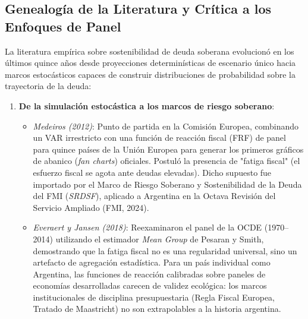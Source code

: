 \documentclass[11pt,a4paper]{article}
\begin{document}
\subsection{Genealogía de la Literatura y Crítica a los Enfoques de Panel}
La literatura empírica sobre sostenibilidad de deuda soberana evolucionó en los últimos quince años desde proyecciones determinísticas de escenario único hacia marcos estocásticos capaces de construir distribuciones de probabilidad sobre la trayectoria de la deuda:
\begin{enumerate}[leftmargin=1.5em]
    \item \textbf{De la simulación estocástica a los marcos de riesgo soberano}:
    \begin{itemize}
        \item \textit{Medeiros (2012)}: Punto de partida en la Comisión Europea, combinando un VAR irrestricto con una función de reacción fiscal (FRF) de panel para quince países de la Unión Europea para generar los primeros gráficos de abanico (\textit{fan charts}) oficiales. Postuló la presencia de "fatiga fiscal" (el esfuerzo fiscal se agota ante deudas elevadas). Dicho supuesto fue importado por el Marco de Riesgo Soberano y Sostenibilidad de la Deuda del FMI (\textit{SRDSF}), aplicado a Argentina en la Octava Revisión del Servicio Ampliado (FMI, 2024).
        \item \textit{Everaert y Jansen (2018)}: Reexaminaron el panel de la OCDE (1970--2014) utilizando el estimador \textit{Mean Group} de Pesaran y Smith, demostrando que la fatiga fiscal no es una regularidad universal, sino un artefacto de agregación estadística. Para un país individual como Argentina, las funciones de reacción calibradas sobre paneles de economías desarrolladas carecen de validez ecológica: los marcos institucionales de disciplina presupuestaria (Regla Fiscal Europea, Tratado de Maastricht) no son extrapolables a la historia argentina.
    \end{itemize}


\end{enumerate}
\end{document}
